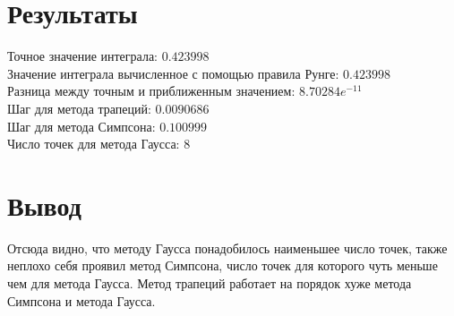 \documentclass[10pt]{scrartcl}
\begin{document}
\section*{Результаты}\noindent
Точное значение интеграла: $0.423998$\\
Значение интеграла вычисленное с помощью правила Рунге: $0.423998$\\
Разница между точным и приближенным значением: $8.70284e^{-11}$\\
Шаг для метода трапеций: $0.0090686$\\
Шаг для метода Симпсона: $0.100999$\\
Число точек для метода Гаусса: $8$\\
\section*{Вывод}\noindent
Отсюда видно, что методу Гаусса понадобилось наименьшее число точек, также неплохо себя проявил метод Симпсона,
число точек для которого чуть меньше чем для метода Гаусса. Метод трапеций работает на порядок хуже метода
Симпсона и метода Гаусса.
\end{document}
